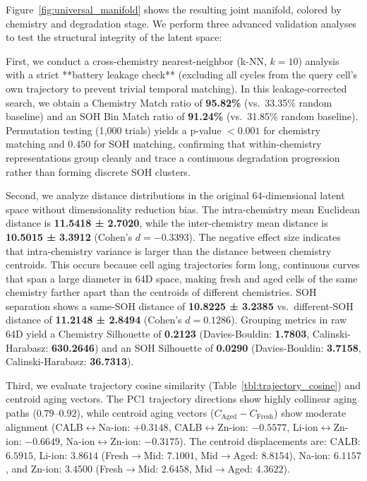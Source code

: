 \documentclass[a4paper,fleqn]{cas-dc}
\begin{document}
Figure~\ref{fig:universal_manifold} shows the resulting joint manifold, colored by chemistry and degradation stage. We perform three advanced validation analyses to test the structural integrity of the latent space:

First, we conduct a cross-chemistry nearest-neighbor (k-NN, $k=10$) analysis with a strict **battery leakage check** (excluding all cycles from the query cell's own trajectory to prevent trivial temporal matching). In this leakage-corrected search, we obtain a Chemistry Match ratio of \textbf{95.82\%} (vs.\ 33.35\% random baseline) and an SOH Bin Match ratio of \textbf{91.24\%} (vs.\ 31.85\% random baseline). Permutation testing (1,000 trials) yields a p-value $<0.001$ for chemistry matching and $0.450$ for SOH matching, confirming that within-chemistry representations group cleanly and trace a continuous degradation progression rather than forming discrete SOH clusters.

Second, we analyze distance distributions in the original 64-dimensional latent space without dimensionality reduction bias. The intra-chemistry mean Euclidean distance is \textbf{11.5418 ± 2.7020}, while the inter-chemistry mean distance is \textbf{10.5015 ± 3.3912} (Cohen's $d = -0.3393$). The negative effect size indicates that intra-chemistry variance is larger than the distance between chemistry centroids. This occurs because cell aging trajectories form long, continuous curves that span a large diameter in 64D space, making fresh and aged cells of the same chemistry farther apart than the centroids of different chemistries. SOH separation shows a same-SOH distance of \textbf{10.8225 ± 3.2385} vs.\ different-SOH distance of \textbf{11.2148 ± 2.8494} (Cohen's $d = 0.1286$). Grouping metrics in raw 64D yield a Chemistry Silhouette of \textbf{0.2123} (Davies-Bouldin: \textbf{1.7803}, Calinski-Harabasz: \textbf{630.2646}) and an SOH Silhouette of \textbf{0.0290} (Davies-Bouldin: \textbf{3.7158}, Calinski-Harabasz: \textbf{36.7313}).

Third, we evaluate trajectory cosine similarity (Table~\ref{tbl:trajectory_cosine}) and centroid aging vectors. The PC1 trajectory directions show highly collinear aging paths ($0.79$--$0.92$), while centroid aging vectors ($C_{\text{Aged}} - C_{\text{Fresh}}$) show moderate alignment (CALB$\leftrightarrow$Na-ion: $+0.3148$, CALB$\leftrightarrow$Zn-ion: $-0.5577$, Li-ion$\leftrightarrow$Zn-ion: $-0.6649$, Na-ion$\leftrightarrow$Zn-ion: $-0.3175$). The centroid displacements are: CALB: $6.5915$, Li-ion: $3.8614$ (Fresh$\rightarrow$Mid: $7.1001$, Mid$\rightarrow$Aged: $8.8154$), Na-ion: $6.1157$, and Zn-ion: $3.4500$ (Fresh$\rightarrow$Mid: $2.6458$, Mid$\rightarrow$Aged: $4.3622$).
\end{document}
